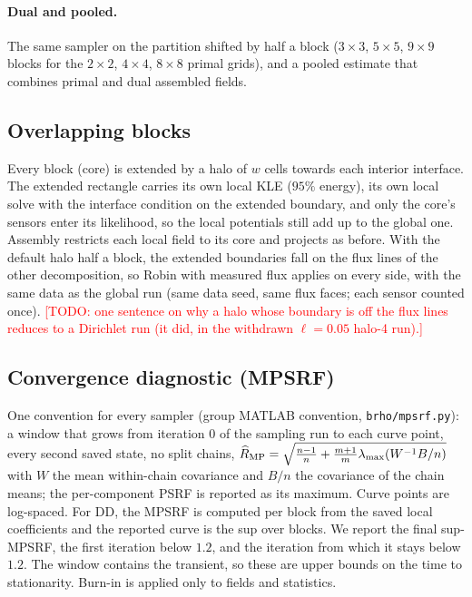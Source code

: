\documentclass[11pt]{article}
\newcommand{\todo}[1]{\textcolor{red}{[TODO: #1]}}
\newcommand{\addmath}[1]{\iftoggle{annotations}{\par\noindent\textbf{\textcolor{annteal}{[Let's add more mathematical detail here\ifx\relax#1\relax\else: #1\fi]}}\par}{}}
\begin{document}
\paragraph{Dual and pooled.} The same sampler on the partition shifted by half a block ($3\times3$, $5\times5$, $9\times9$ blocks for the $2\times2$, $4\times4$, $8\times8$ primal grids), and a pooled estimate that combines primal and dual assembled fields.

\subsection{Overlapping blocks}\label{sec:overlap}
\addmath{a figure of the core, the halo and the extended block with the flux lines, and the statement that the local potentials still sum to the global one}
Every block (core) is extended by a halo of $w$ cells towards each interior interface. The extended rectangle carries its own local KLE ($95\%$ energy), its own local solve with the interface condition on the extended boundary, and only the core's sensors enter its likelihood, so the local potentials still add up to the global one. Assembly restricts each local field to its core and projects as before. With the default halo half a block, the extended boundaries fall on the flux lines of the other decomposition, so Robin with measured flux applies on every side, with the same data as the global run (same data seed, same flux faces; each sensor counted once). \todo{one sentence on why a halo whose boundary is off the flux lines reduces to a Dirichlet run (it did, in the withdrawn $\ell=0.05$ halo-4 run).}

\subsection{Convergence diagnostic (MPSRF)}\label{sec:mpsrf}
One convention for every sampler (group MATLAB convention, \texttt{brho/mpsrf.py}): a window that grows from iteration $0$ of the sampling run to each curve point, every second saved state, no split chains, $\widehat R_{\rm MP}=\sqrt{\tfrac{n-1}{n}+\tfrac{m+1}{m}\lambda_{\max}(W^{-1}B/n)}$ with $W$ the mean within-chain covariance and $B/n$ the covariance of the chain means; the per-component PSRF is reported as its maximum. Curve points are log-spaced. For DD, the MPSRF is computed per block from the saved local coefficients and the reported curve is the sup over blocks. We report the final sup-MPSRF, the first iteration below $1.2$, and the iteration from which it stays below $1.2$. The window contains the transient, so these are upper bounds on the time to stationarity. Burn-in is applied only to fields and statistics.
\end{document}
